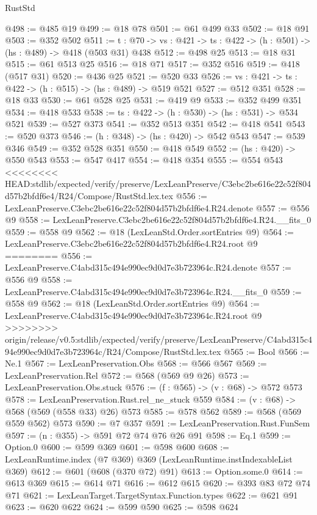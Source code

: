 \begin{lexlean}{RustStd}
\begin{coremodule}
{\begin{coremodule}
@498 := @485 @19
@499 := @18 @78
@501 := @61 @499 @33
@502 := @18 @91
@503 := @352 @502
@511 := {t : @70} -> {vs : @421} -> {ts : @422} -> (h : @501) -> (hs : @489) -> @418 (@503 @31) @438
@512 := @498 @25
@513 := @18 @31
@515 := @61 @513 @25
@516 := @18 @71
@517 := @352 @516
@519 := @418 (@517 @31)
@520 := @436 @25
@521 := @520 @33
@526 := {vs : @421} -> {ts : @422} -> (h : @515) -> (hs : @489) -> @519 @521
@527 := @512 @351
@528 := @18 @33
@530 := @61 @528 @25
@531 := @419 @9
@533 := @352 @499 @351
@534 := @418 @533
@538 := {ts : @422} -> (h : @530) -> (hs : @531) -> @534 @521
@539 := @527 @373
@541 := @352 @513 @351
@542 := @418 @541
@543 := @520 @373
@546 := (h : @348) -> (hs : @420) -> @542 @543
@547 := @539 @346
@549 := @352 @528 @351
@550 := @418 @549
@552 := (hs : @420) -> @550 @543
@553 := @547 @417
@554 := @418 @354
@555 := @554 @543
<<<<<<<< HEAD:stdlib/expected/verify/preserve/LexLeanPreserve/C3ebc2be616e22c52f804d57b2bfdf6e4/R24/Compose/RustStd.lex.tex
@556 := LexLeanPreserve.C3ebc2be616e22c52f804d57b2bfdf6e4.R24.denote
@557 := @556 @9
@558 := LexLeanPreserve.C3ebc2be616e22c52f804d57b2bfdf6e4.R24.__fits_0
@559 := @558 @9
@562 := @18 (LexLeanStd.Order.sortEntries @9)
@564 := LexLeanPreserve.C3ebc2be616e22c52f804d57b2bfdf6e4.R24.root @9
========
@556 := LexLeanPreserve.C4abd315c494e990ec9d0d7e3b723964c.R24.denote
@557 := @556 @9
@558 := LexLeanPreserve.C4abd315c494e990ec9d0d7e3b723964c.R24.__fits_0
@559 := @558 @9
@562 := @18 (LexLeanStd.Order.sortEntries @9)
@564 := LexLeanPreserve.C4abd315c494e990ec9d0d7e3b723964c.R24.root @9
>>>>>>>> origin/release/v0.5:stdlib/expected/verify/preserve/LexLeanPreserve/C4abd315c494e990ec9d0d7e3b723964c/R24/Compose/RustStd.lex.tex
@565 := Bool
@566 := Ne.{1}
@567 := LexLeanPreservation.Obs
@568 := @566 @567
@569 := LexLeanPreservation.Rel
@572 := @568 (@569 @9 @26)
@573 := LexLeanPreservation.Obs.stuck
@576 := (f : @565) -> (v : @68) -> @572 @573
@578 := LexLeanPreservation.Rust.rel_ne_stuck @559
@584 := (v : @68) -> @568 (@569 (@558 @33) @26) @573
@585 := @578 @562
@589 := @568 (@569 @559 @562) @573
@590 := @7 @357
@591 := LexLeanPreservation.Rust.FunSem
@597 := (n : @355) -> @591 @72 @74 @76 @26 @91
@598 := Eq.{1}
@599 := Option.{0}
@600 := @599 @369
@601 := @598 @600
@608 := LexLeanRuntime.index (@7 @369) @369 (LexLeanRuntime.instIndexableList @369)
@612 := @601 (@608 (@370 @72) @91)
@613 := Option.some.{0}
@614 := @613 @369
@615 := @614 @71
@616 := @612 @615
@620 := @393 @83 @72 @74 @71
@621 := LexLeanTarget.TargetSyntax.Function.types
@622 := @621 @91
@623 := @620 @622
@624 := @599 @590
@625 := @598 @624

\end{coremodule}}
\end{coremodule}
\end{lexlean}
